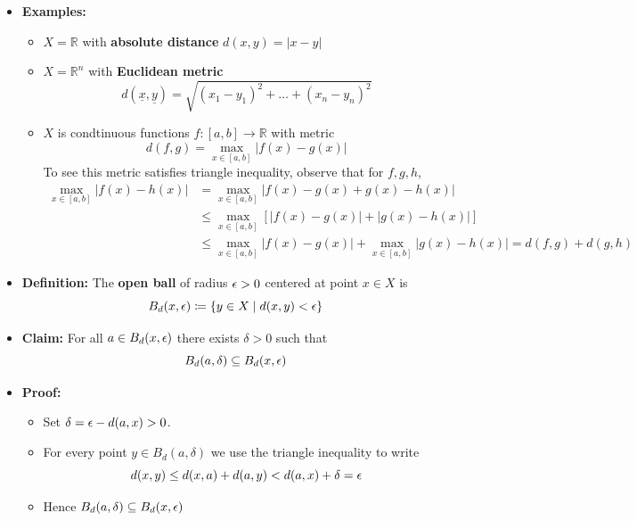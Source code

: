 \documentclass[11pt,twoside]{report}
\newcommand{\bbR}{{\mathbb{R}}}
\newcommand{\vecnot}{\underline}
\begin{document}
\begin{itemize}
\begin{itemize}
\item The elements of $X$ are called \textbf{points} 
\item $d(x,y)$ is called the \textbf{distance} %

\end{itemize}
\item \textbf{Examples:}

\begin{itemize}
\item  $X = \bbR$ with \textbf{absolute distance} $d(x,y)  = |x-y|$

\item   $X = \bbR^n$ with \textbf{Euclidean metric}  
\[
d(\vecnot{x},\vecnot{y})=\sqrt{(x_1-y_1)^2 + \ldots + (x_n-y_n)^2}
\]

\item $X$ is condtinuous functions $f \colon [a,b] \to \bbR$ with metric
\[
d(f,g) = \max_{x \in [a,b] } |f(x) -g(x)|
\]
To see this metric satisfies triangle inequality, observe that for $f, g, h$, 
  \begin{align*}
    \max_{x\in [a,b]} | f(x) - h(x) |
    &= \max_{x\in [a,b]} | f(x) - g(x) + g(x) - h(x) |  \\
    &\leq \max_{x\in [a,b]} \left[ |f(x) - g(x)| + |g(x) - h(x)| \right] \\
    &\leq \max_{x\in [a,b]} |f(x) - g(x)| + \max_{x\in [a,b]} |g(x) - h(x)| = d(f,g) + d(g,h)
  \end{align*}

\end{itemize}



\item \textbf{Definition:}  The \textbf{open ball} of radius $\epsilon > 0$ centered at point $x \in X$ is 
\[
B_d(x,\epsilon) \coloneqq \{ y \in X \mid d(x,y)  < \epsilon\} 
\]

\item \textbf{Claim:} For all $a \in B_d(x,\epsilon)$ there exists $\delta > 0$ such that 
\[
B_d(a,\delta) \subseteq B_d(x,\epsilon) 
\]
 \item \textbf{Proof:}
 \begin{itemize}
 
 \item Set $\delta = \epsilon -  d(a,x) > 0$. 
 
 \item For every point $y \in B_d(a, \delta )$ we use the triangle inequality to write 
 \[
 d(x,y) \le d(x,a)  + d(a, y) <d(a,x) + \delta  = \epsilon 
 \]
 \item Hence  $B_d(a,\delta) \subseteq B_d(x,\epsilon)$
 \end{itemize} 

\end{itemize}
\end{document}

